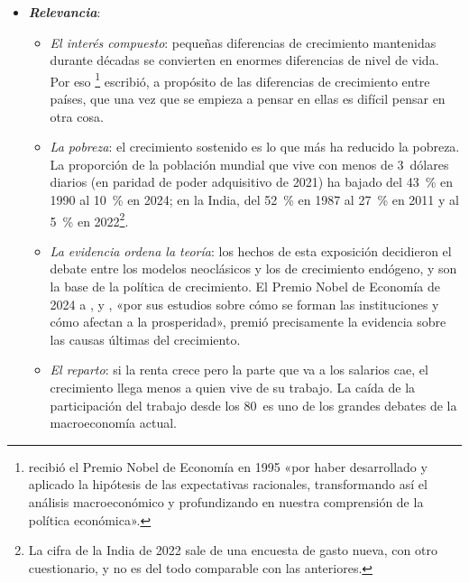 \documentclass[11pt]{article}
\begin{document}
\begin{itemize}
\item \textbf{\emph{Relevancia}}:
  \begin{itemize}
  \item \emph{El interés compuesto}: pequeñas diferencias de crecimiento mantenidas durante décadas se convierten en enormes diferencias de nivel de vida. Por eso \textcite[p.~5]{Lucas1988}\footnote{ recibió el Premio Nobel de Economía en 1995 «por haber desarrollado y aplicado la hipótesis de las expectativas racionales, transformando así el análisis macroeconómico y profundizando en nuestra comprensión de la política económica»\nocite{NobelPrize1995Lucas}.} escribió, a propósito de las diferencias de crecimiento entre países, que una vez que se empieza a pensar en ellas es difícil pensar en otra cosa.
  \item \emph{La pobreza}: el crecimiento sostenido es lo que más ha reducido la pobreza. La proporción de la población mundial que vive con menos de 3~dólares diarios (en paridad de poder adquisitivo de 2021) ha bajado del 43~\% en 1990 al 10~\% en 2024; en la India, del 52~\% en 1987 al 27~\% en 2011 y al 5~\% en 2022\nocite{BM2026PIP}\footnote{La cifra de la India de 2022 sale de una encuesta de gasto nueva, con otro cuestionario, y no es del todo comparable con las anteriores\nocite{BM2026PIP}.}.
  \item \emph{La evidencia ordena la teoría}: los hechos de esta exposición decidieron el debate entre los modelos neoclásicos y los de crecimiento endógeno, y son la base de la política de crecimiento. El Premio Nobel de Economía de 2024 a ,  y , «por sus estudios sobre cómo se forman las instituciones y cómo afectan a la prosperidad»\nocite{NobelPrize2024}, premió precisamente la evidencia sobre las causas últimas del crecimiento.
  \item \emph{El reparto}: si la renta crece pero la parte que va a los salarios cae, el crecimiento llega menos a quien vive de su trabajo. La caída de la participación del trabajo desde los 80~es uno de los grandes debates de la macroeconomía actual.
  \end{itemize}


\end{itemize}
\end{document}
